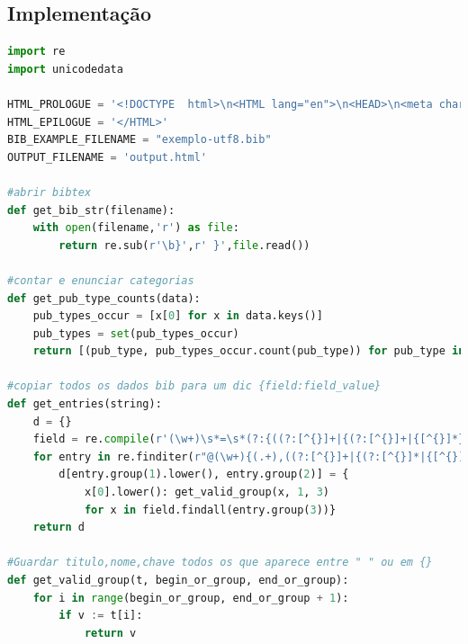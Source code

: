 \documentclass[11pt,a4paper]{report}
\begin{document}
\subsection{Implementação}
\begin{lstlisting}[language=python]
import re
import unicodedata

HTML_PROLOGUE = '<!DOCTYPE  html>\n<HTML lang="en">\n<HEAD>\n<meta charset="utf-8">\n      <TITLE>Categories in BibTeX</TITLE>\n <script type="text/x-mathjax-config"> MathJax.Hub.Config({"extensions":["tex2jax.js"],"jax":["input/TeX","output/HTML-CSS"],"messageStyle":"none","tex2jax":{"processEnvironments":false,"processEscapes":true,"inlineMath":[["$","$"],["\\(","\\)"]],"displayMath":[["$$","$$"],["\\[","\\]"]]},"TeX":{"extensions":["AMSmath.js","AMSsymbols.js","noErrors.js","noUndefined.js"]},"HTML-CSS":{"availableFonts":["TeX"]}}); </script> <script type="text/javascript" async src="file:////home/useralef/.vscode/extensions/shd101wyy.markdown-preview-enhanced-0.6.1/node_modules/@shd101wyy/mume/dependencies/mathjax/MathJax.js" charset="UTF-8"></script>  </HEAD>\n'
HTML_EPILOGUE = '</HTML>'
BIB_EXAMPLE_FILENAME = "exemplo-utf8.bib"
OUTPUT_FILENAME = 'output.html'

#abrir bibtex
def get_bib_str(filename):
    with open(filename,'r') as file:
        return re.sub(r'\b}',r' }',file.read())

#contar e enunciar categorias
def get_pub_type_counts(data):
    pub_types_occur = [x[0] for x in data.keys()]
    pub_types = set(pub_types_occur)
    return [(pub_type, pub_types_occur.count(pub_type)) for pub_type in pub_types]

#copiar todos os dados bib para um dic {field:field_value}
def get_entries(string):
    d = {}
    field = re.compile(r'(\w+)\s*=\s*(?:{((?:[^{}]+|{(?:[^{}]+|{[^{}]*})+})+)}|"([^"]+)"|(\d+))')
    for entry in re.finditer(r"@(\w+){(.+),((?:[^{}]+|{(?:[^{}]*|{[^{}]*})+})+)", string):
        d[entry.group(1).lower(), entry.group(2)] = {
            x[0].lower(): get_valid_group(x, 1, 3)
            for x in field.findall(entry.group(3))}
    return d

#Guardar titulo,nome,chave todos os que aparece entre " " ou em {}
def get_valid_group(t, begin_or_group, end_or_group):
    for i in range(begin_or_group, end_or_group + 1):
        if v := t[i]:
            return v


\end{lstlisting}
\end{document}
